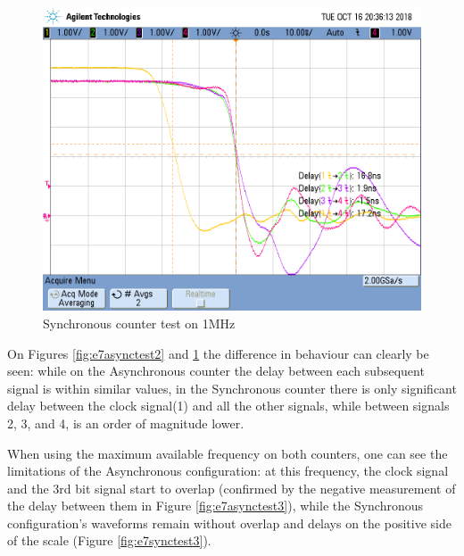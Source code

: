 \documentclass[paper=a4]{article}
\begin{document}
    \begin{figure}[ht]
        \begin{center}
            \includegraphics[width=0.6\linewidth]{images/e3_e7_sync_1mhz.png}
            \caption{Synchronous counter test on 1MHz}
            \label{fig:e7synctest2}
        \end{center}
    \end{figure}

    On Figures \ref{fig:e7asynctest2} and \ref{fig:e7synctest2} the difference in behaviour can clearly be seen:
    while on the Asynchronous counter the delay between each subsequent signal is within similar values, in the 
    Synchronous counter there is only significant delay between the clock signal(1) and all the other signals, while
    between signals 2, 3, and 4, is an order of magnitude lower.
    
    When using the maximum available frequency on both counters, one can see the limitations of the Asynchronous 
    configuration: at this frequency, the clock signal and the 3rd bit signal start to overlap (confirmed by the 
    negative measurement of the delay between them in Figure \ref{fig:e7asynctest3}), while the Synchronous configuration's waveforms remain without
    overlap and delays on the positive side of the scale (Figure \ref{fig:e7synctest3}).
\end{document}
